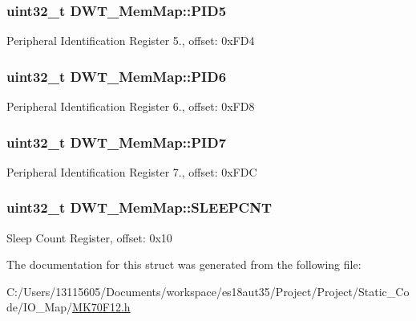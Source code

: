 \subsubsection[{P\+I\+D5}]{\setlength{\rightskip}{0pt plus 5cm}uint32\+\_\+t D\+W\+T\+\_\+\+Mem\+Map\+::\+P\+I\+D5}\label{struct_d_w_t___mem_map_a8b21a1c5290151d5474deb51c391b85b}
Peripheral Identification Register 5., offset\+: 0x\+F\+D4 \hypertarget{struct_d_w_t___mem_map_a7c3faa2d806e506a32d9d3283e3717c2}{}
\subsubsection[{P\+I\+D6}]{\setlength{\rightskip}{0pt plus 5cm}uint32\+\_\+t D\+W\+T\+\_\+\+Mem\+Map\+::\+P\+I\+D6}\label{struct_d_w_t___mem_map_a7c3faa2d806e506a32d9d3283e3717c2}
Peripheral Identification Register 6., offset\+: 0x\+F\+D8 \hypertarget{struct_d_w_t___mem_map_af0158099ec07706eef6138a50643e1c8}{}
\subsubsection[{P\+I\+D7}]{\setlength{\rightskip}{0pt plus 5cm}uint32\+\_\+t D\+W\+T\+\_\+\+Mem\+Map\+::\+P\+I\+D7}\label{struct_d_w_t___mem_map_af0158099ec07706eef6138a50643e1c8}
Peripheral Identification Register 7., offset\+: 0x\+F\+D\+C \hypertarget{struct_d_w_t___mem_map_a0c31354b6fe3f3dd79bc5b768bea4f46}{}
\subsubsection[{S\+L\+E\+E\+P\+C\+N\+T}]{\setlength{\rightskip}{0pt plus 5cm}uint32\+\_\+t D\+W\+T\+\_\+\+Mem\+Map\+::\+S\+L\+E\+E\+P\+C\+N\+T}\label{struct_d_w_t___mem_map_a0c31354b6fe3f3dd79bc5b768bea4f46}
Sleep Count Register, offset\+: 0x10 

The documentation for this struct was generated from the following file\+:\begin{DoxyCompactItemize}
\item 
C\+:/\+Users/13115605/\+Documents/workspace/es18aut35/\+Project/\+Project/\+Static\+\_\+\+Code/\+I\+O\+\_\+\+Map/\hyperlink{_m_k70_f12_8h}{M\+K70\+F12.\+h}\end{DoxyCompactItemize}
